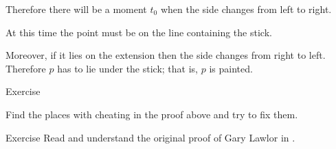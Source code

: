 Therefore there will be a moment $t_0$ when the side changes from left to right.

At this time the point must be on the line containing the stick. 

Moreover, if it lies on the extension then the side changes from right to left. Therefore $p$ has to lie under the stick; that is, $p$ is painted.

\qeds



\begin{thm}{Exercise}

Find the places with cheating in the proof above and try to fix them.

\end{thm}



\begin{thm}{Exercise} Read and understand the original proof of Gary Lawlor in \cite{lawlor}.

\end{thm}










